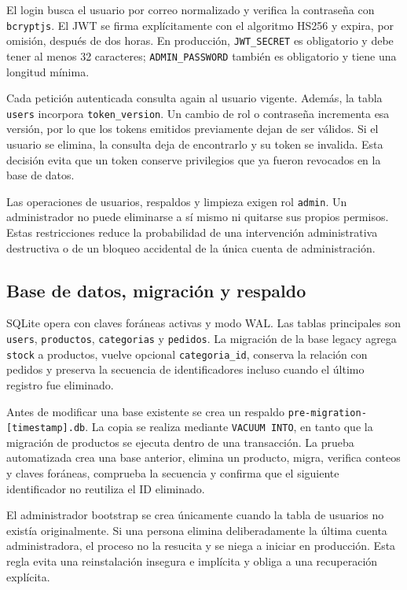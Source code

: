 \documentclass[12pt,a4paper]{article}
\begin{document}
El login busca el usuario por correo normalizado y verifica la contraseña con \texttt{bcryptjs}. El JWT se firma explícitamente con el algoritmo HS256 y expira, por omisión, después de dos horas. En producción, \texttt{JWT\_SECRET} es obligatorio y debe tener al menos 32 caracteres; \texttt{ADMIN\_PASSWORD} también es obligatorio y tiene una longitud mínima.

Cada petición autenticada consulta again al usuario vigente. Además, la tabla \texttt{users} incorpora \texttt{token\_version}. Un cambio de rol o contraseña incrementa esa versión, por lo que los tokens emitidos previamente dejan de ser válidos. Si el usuario se elimina, la consulta deja de encontrarlo y su token se invalida. Esta decisión evita que un token conserve privilegios que ya fueron revocados en la base de datos.

Las operaciones de usuarios, respaldos y limpieza exigen rol \texttt{admin}. Un administrador no puede eliminarse a sí mismo ni quitarse sus propios permisos. Estas restricciones reduce la probabilidad de una intervención administrativa destructiva o de un bloqueo accidental de la única cuenta de administración.

\subsection{Base de datos, migración y respaldo}

SQLite opera con claves foráneas activas y modo WAL. Las tablas principales son \texttt{users}, \texttt{productos}, \texttt{categorias} y \texttt{pedidos}. La migración de la base legacy agrega \texttt{stock} a productos, vuelve opcional \texttt{categoria\_id}, conserva la relación con pedidos y preserva la secuencia de identificadores incluso cuando el último registro fue eliminado.

Antes de modificar una base existente se crea un respaldo \texttt{pre-migration-[timestamp].db}. La copia se realiza mediante \texttt{VACUUM INTO}, en tanto que la migración de productos se ejecuta dentro de una transacción. La prueba automatizada crea una base anterior, elimina un producto, migra, verifica conteos y claves foráneas, comprueba la secuencia y confirma que el siguiente identificador no reutiliza el ID eliminado.

El administrador bootstrap se crea únicamente cuando la tabla de usuarios no existía originalmente. Si una persona elimina deliberadamente la última cuenta administradora, el proceso no la resucita y se niega a iniciar en producción. Esta regla evita una reinstalación insegura e implícita y obliga a una recuperación explícita.
\end{document}
